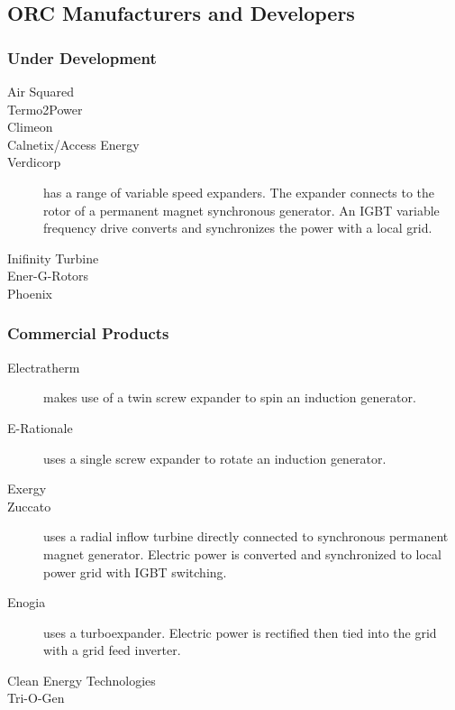 

\subsection{ORC Manufacturers and Developers}
\subsubsection{Under Development}
\begin{description}
\item[Air Squared]
\item[Termo2Power]
\item[Climeon]
\item[Calnetix/Access Energy]
\item[Verdicorp] has a range of variable speed expanders. The expander connects to the rotor of a permanent magnet synchronous generator. An IGBT variable frequency drive converts and synchronizes the power with a local grid.
\item[Inifinity Turbine]
\item[Ener-G-Rotors]
\item[Phoenix]
\end{description}
\subsubsection{Commercial Products}
\begin{description}
\item[Electratherm] makes use of a twin screw expander to spin an induction generator.
\item[E-Rationale] uses a single screw expander to rotate an induction generator.
\item[Exergy] %
\item[Zuccato] uses a radial inflow turbine directly connected to synchronous permanent magnet generator. Electric power is converted and synchronized to local power grid with IGBT switching.
\item[Enogia] uses a turboexpander. Electric power is rectified then tied into the grid with a grid feed inverter.
\item[Clean Energy Technologies] %
\item[Tri-O-Gen] %
\end{description}

